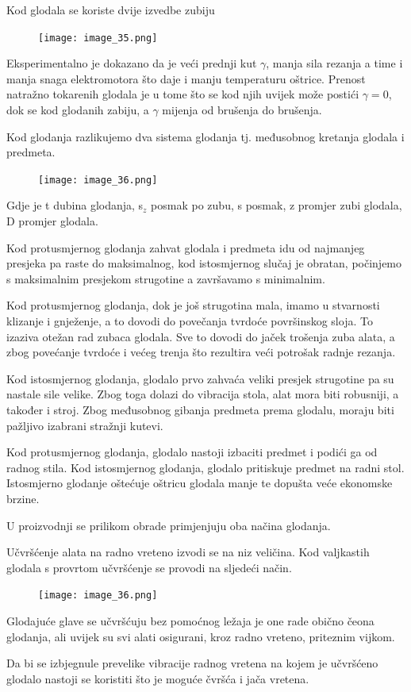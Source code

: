 \documentclass[a4paper,12pt]{article}
\numberwithin{figure}{section}
\begin{document}
\clearpage
Kod glodala se koriste dvije izvedbe zubiju
\begin{figure}[!h]
\centering
\texttt{[image: image\_35.png]}
\end{figure}
\FloatBarrier
Eksperimentalno je dokazano da je veći prednji kut $\gamma$, manja sila rezanja a time i manja snaga elektromotora što daje i manju temperaturu oštrice. Prenost natražno tokarenih glodala je u tome što se kod njih uvijek može postići $\gamma = 0$, dok se kod glodanih zabiju, a $\gamma$ mijenja od brušenja do brušenja.\par
Kod glodanja razlikujemo dva sistema glodanja tj. međusobnog kretanja glodala i predmeta.
\begin{figure}[!h]
\centering
\texttt{[image: image\_36.png]}
\end{figure}
\FloatBarrier
Gdje je t dubina glodanja, s$_{z}$ posmak po zubu, s posmak, z promjer zubi glodala, D promjer glodala. \par
Kod protusmjernog glodanja zahvat glodala i predmeta idu od najmanjeg presjeka pa raste do maksimalnog, kod istosmjernog slučaj je obratan, počinjemo s maksimalnim presjekom strugotine a završavamo s minimalnim.\par
Kod  protusmjernog glodanja, dok je još strugotina mala, imamo u stvarnosti klizanje i gnježenje, a to dovodi do povečanja tvrdoće površinskog sloja. To izaziva otežan rad zubaca glodala. Sve to dovodi do jaček trošenja zuba alata, a zbog povećanje tvrdoće i većeg trenja što rezultira veći potrošak radnje rezanja.\par
Kod istosmjernog glodanja, glodalo prvo zahvaća veliki presjek strugotine pa su nastale sile velike. Zbog toga
dolazi do vibracija stola, alat mora biti robusniji, a također i stroj. Zbog međusobnog gibanja predmeta prema glodalu, moraju biti pažljivo izabrani stražnji kutevi. \par
Kod protusmjernog glodanja, glodalo nastoji izbaciti predmet i podići ga od radnog stila. Kod istosmjernog glodanja, glodalo pritiskuje predmet na radni stol. Istosmjerno glodanje oštećuje oštricu glodala manje te dopušta veće ekonomske brzine.\par
U proizvodnji se prilikom obrade primjenjuju oba načina glodanja.\par
Učvršćenje alata na radno vreteno izvodi se na niz veličina. Kod valjkastih glodala s provrtom učvršćenje se provodi na sljedeći način.
\begin{figure}[!h]
\centering
\texttt{[image: image\_36.png]}
\end{figure}
\FloatBarrier
Glodajuće glave se učvršćuju bez pomoćnog ležaja je one rade obično čeona glodanja, ali uvijek su svi alati osigurani, kroz radno vreteno, priteznim vijkom.\par
Da bi se izbjegnule prevelike vibracije radnog vretena na kojem je učvršćeno glodalo nastoji se koristiti što je moguće čvršća i jača vretena.
\end{document}
